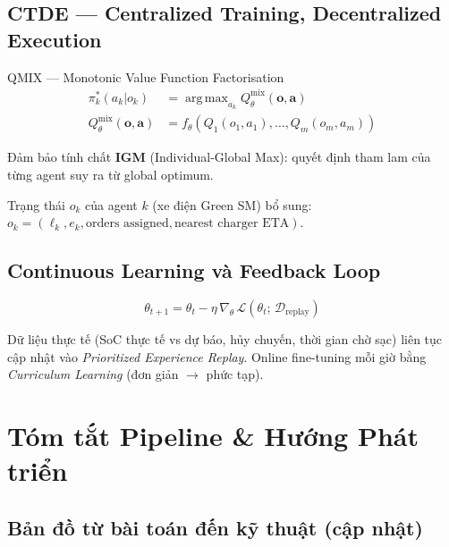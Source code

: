 \documentclass[12pt,a4paper]{article}
\DeclareMathOperator{\argmax}{arg\,max}
\begin{document}
\subsection{CTDE --- Centralized Training, Decentralized Execution}

\begin{formulabox}{QMIX --- Monotonic Value Function Factorisation}
\begin{align}
  \pi_k^*(a_k|o_k) &= \argmax_{a_k} Q^{\mathrm{mix}}_\theta(\bm{o},\bm{a})\\
  Q^{\mathrm{mix}}_\theta(\bm{o},\bm{a}) &= f_\theta(Q_1(o_1,a_1),\ldots,Q_m(o_m,a_m))
\end{align}
\end{formulabox}

Đảm bảo tính chất \textbf{IGM} (Individual-Global Max): quyết định tham lam
của từng agent suy ra từ global optimum.

Trạng thái $o_k$ của agent $k$ (xe điện Green SM) bổ sung:
$o_k = (\ell_k, e_k, \text{orders assigned}, \text{nearest charger ETA})$.

\subsection{Continuous Learning và Feedback Loop}

\begin{equation}
  \theta_{t+1}
  = \theta_t - \eta\,\nabla_\theta\,
    \mathcal{L}(\theta_t;\,\mathcal{D}_{\mathrm{replay}})
\end{equation}

Dữ liệu thực tế (SoC thực tế vs dự báo, hủy chuyến, thời gian chờ sạc)
liên tục cập nhật vào \emph{Prioritized Experience Replay}.
Online fine-tuning mỗi giờ bằng \emph{Curriculum Learning}
(đơn giản $\rightarrow$ phức tạp).

\section{Tóm tắt Pipeline \& Hướng Phát triển}

\subsection{Bản đồ từ bài toán đến kỹ thuật (cập nhật)}
\end{document}

